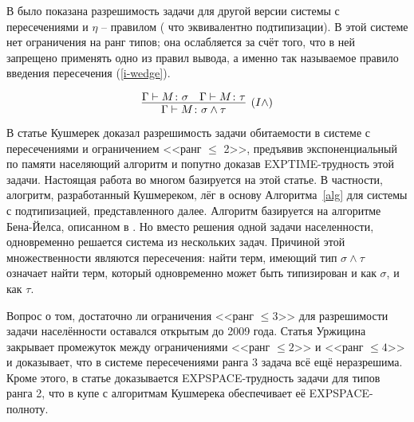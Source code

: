 \documentclass[../main.tex]{subfiles}
\begin{document}
В \cite{kurata_1995} было показана разрешимость задачи для другой версии системы с пересечениями и $\eta$ -- правилом ( что эквивалентно подтипизации). В этой системе нет ограничения на ранг типов; она ослабляется за счёт того, что в ней запрещено применять одно из правил вывода, а именно так называемое правило введения пересечения (\ref{i-wedge}). 

\begin{equation} \label{i-wedge}
\infer[(I\wedge)]{\Gamma \vdash M \colon \sigma \wedge \tau}{\Gamma \vdash M \colon \sigma & \Gamma \vdash M \colon \tau}
\end{equation}

В статье \cite{kusmierek_2007} Кушмерек доказал разрешимость задачи обитаемости в системе с пересечениями и ограничением <<ранг $\leqslant$ 2>>, предъявив экспоненциальный по памяти населяющий алгоритм и попутно доказав EXPTIME-трудность этой задачи. Настоящая работа во многом базируется на этой статье. В частности, алогритм, разработанный Кушмереком, лёг в основу Алгоритма~\ref{alg} для системы с подтипизацией, представленного далее. Алгоритм базируется на алгоритме Бена-Йелса, описанном в \cite{hindley_2008}. Но вместо решения одной задачи населенности, одновременно решается система из нескольких задач. Причиной этой множественности являются пересечения: найти терм, имеющий тип $\sigma \wedge \tau$ означает найти терм, который одновременно может быть типизирован и как $\sigma$, и как $\tau$. 

Вопрос о том, достаточно ли ограничения <<ранг $\leqslant 3$>> для разрешимости задачи населённости оставался открытым до 2009 года. Статья Уржицина\cite{urzyczyn_2009} закрывает промежуток между ограничениями <<ранг $\leqslant 2$>> и <<ранг $\leqslant 4$>> и доказывает, что в системе пересечениями ранга $3$ задача всё ещё неразрешима. Кроме этого, в статье доказывается EXPSPACE-трудность задачи для типов ранга 2, что в купе с алгоритмам Кушмерека обеспечивает её EXPSPACE-полноту.


\end{document}
